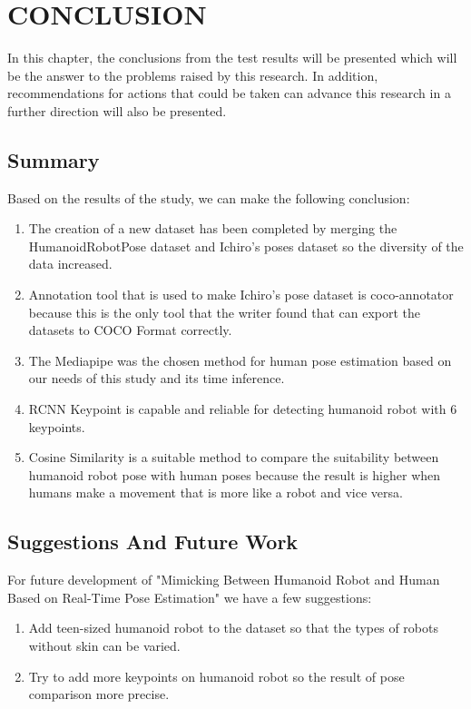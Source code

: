 \chapter{CONCLUSION}
\label{chap:conclusion}

In this chapter, the conclusions from the test results will be presented which will be the answer to the problems raised by this research.
In addition, recommendations for actions that could be taken can advance this research in a further direction will also be presented.

\section{Summary}
\label{sec:summary}

Based on the results of the study, we can make the following conclusion:

\begin{enumerate}[nolistsep]

  \item The creation of a new dataset has been completed by merging the HumanoidRobotPose dataset and Ichiro's poses dataset so the diversity of the data increased.
  \item Annotation tool that is used to make Ichiro's pose dataset is coco-annotator because this is the only tool that the writer found that can export the datasets to COCO Format correctly.
  \item The Mediapipe was the chosen method for human pose estimation based on our needs of this study and its time inference.
  \item RCNN Keypoint is capable and reliable for detecting humanoid robot with 6 keypoints.
  \item Cosine Similarity is a suitable method to compare the suitability between humanoid robot pose with human poses because the result is higher when
  humans make a movement that is more like a robot and vice versa.

\end{enumerate}

\section{Suggestions And Future Work}
\label{chap:suggestionsandfuturework}

For future development of "Mimicking Between Humanoid Robot and Human Based on Real-Time Pose Estimation" we have a few suggestions:

\begin{enumerate}[nolistsep]

  \item Add teen-sized humanoid robot to the dataset so that the types of robots without skin can be varied.
  \item Try to add more keypoints on humanoid robot so the result of pose comparison more precise.

\end{enumerate}
